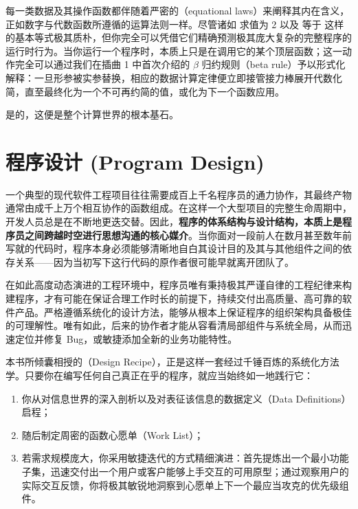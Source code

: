 每一类数据及其操作函数都伴随着严密的（equational laws）来阐释其内在含义，正如数字与代数函数所遵循的运算法则一样。尽管诸如  求值为 2 以及  等于  这样的基本等式极其质朴，但你完全可以凭借它们精确预测极其庞大复杂的完整程序的运行时行为。当你运行一个程序时，本质上只是在调用它的某个顶层函数；这一动作完全可以通过我们在插曲 1 中首次介绍的 $\beta$ 归约规则（beta rule）予以形式化解释：一旦形参被实参替换，相应的数据计算定律便立即接管接力棒展开代数化简，直至最终化为一个不可再约简的值，或化为下一个函数应用。

是的，这便是整个计算世界的根本基石。

\section*{程序设计 (Program Design)}
\label{sec:epilogue_design}

一个典型的现代软件工程项目往往需要成百上千名程序员的通力协作，其最终产物通常由成千上万个相互协作的函数组成。在这样一个大型项目的完整生命周期中，开发人员总是在不断地更迭交替。因此，\textbf{程序的体系结构与设计结构，本质上是程序员之间跨越时空进行思想沟通的核心媒介}。当你面对一段前人在数月甚至数年前写就的代码时，程序本身必须能够清晰地自白其设计目的及其与其他组件之间的依存关系——因为当初写下这行代码的原作者很可能早就离开团队了。

在如此高度动态演进的工程环境中，程序员唯有秉持极其严谨自律的工程纪律来构建程序，才有可能在保证合理工作时长的前提下，持续交付出高质量、高可靠的软件产品。严格遵循系统化的设计方法，能够从根本上保证程序的组织架构具备极佳的可理解性。唯有如此，后来的协作者才能从容看清局部组件与系统全局，从而迅速定位并修复 Bug，或敏捷添加全新的业务功能特性。

本书所倾囊相授的（Design Recipe），正是这样一套经过千锤百炼的系统化方法学。只要你在编写任何自己真正在乎的程序，就应当始终如一地践行它：
\begin{enumerate}
  \item 你从对信息世界的深入剖析以及对表征该信息的数据定义（Data Definitions）启程；
  \item 随后制定周密的函数心愿单（Work List）；
  \item 若需求规模庞大，你采用敏捷迭代的方式精细演进：首先提炼出一个最小功能子集，迅速交付出一个用户或客户能够上手交互的可用原型；通过观察用户的实际交互反馈，你将极其敏锐地洞察到心愿单上下一个最应当攻克的优先级组件。
\end{enumerate}

